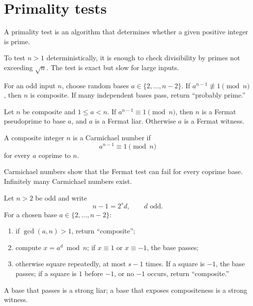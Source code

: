 \section{Primality tests}

\begin{de}
A primality test is an algorithm that determines whether a given positive integer is prime.
\end{de}

\begin{remark}
To test $n>1$ deterministically, it is enough to check divisibility by primes not exceeding $\sqrt n$.  The test is exact but slow for large inputs.
\end{remark}

\begin{app}
For an odd input $n$, choose random bases $a\in\{2,\ldots,n-2\}$.  If
$a^{n-1}\not\equiv1\pmod n$, then $n$ is composite.  If many independent bases pass, return ``probably prime.''
\end{app}

\begin{de}
Let $n$ be composite and $1\le a<n$.  If $a^{n-1}\equiv1\pmod n$, then $n$ is a Fermat pseudoprime to base $a$, and $a$ is a Fermat liar.  Otherwise $a$ is a Fermat witness.
\end{de}

\begin{de}
A composite integer $n$ is a Carmichael number if
\[
 a^{n-1}\equiv1\pmod n
\]
for every $a$ coprime to $n$.
\end{de}
\begin{remark}
Carmichael numbers show that the Fermat test can fail for every coprime base.  Infinitely many Carmichael numbers exist.
\end{remark}

\begin{app}
Let $n>2$ be odd and write
\[
 n-1=2^s d,\qquad d\text{ odd}.
\]
For a chosen base $a\in\{2,\ldots,n-2\}$:
\begin{enumerate}
\item if $\gcd(a,n)>1$, return ``composite'';
\item compute $x=a^d\bmod n$; if $x\equiv1$ or $x\equiv-1$, the base passes;
\item otherwise square repeatedly, at most $s-1$ times.  If a square is $-1$, the base passes; if a square is $1$ before $-1$, or no $-1$ occurs, return ``composite.''
\end{enumerate}
A base that passes is a strong liar; a base that exposes compositeness is a strong witness.
\end{app}

